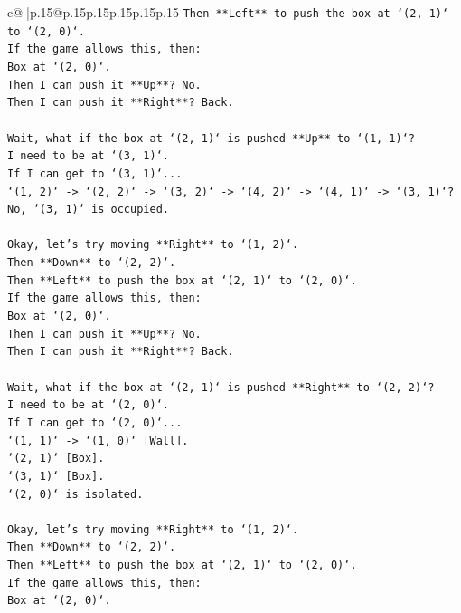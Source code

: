 \documentclass{article}
\begin{document}
{\begin{supertabular}{c@{$\;$}|p{.15\linewidth}@{}p{.15\linewidth}p{.15\linewidth}p{.15\linewidth}p{.15\linewidth}p{.15\linewidth}}
{{{\texttt{Then **Left** to push the box at `(2, 1)` to `(2, 0)`.} \\
\texttt{If the game allows this, then:} \\
\texttt{Box at `(2, 0)`.} \\
\texttt{Then I can push it **Up**? No.} \\
\texttt{Then I can push it **Right**? Back.} \\
\\ 
\texttt{Wait, what if the box at `(2, 1)` is pushed **Up** to `(1, 1)`?} \\
\texttt{I need to be at `(3, 1)`.} \\
\texttt{If I can get to `(3, 1)`...} \\
\texttt{`(1, 2)` {-}> `(2, 2)` {-}> `(3, 2)` {-}> `(4, 2)` {-}> `(4, 1)` {-}> `(3, 1)`? No, `(3, 1)` is occupied.} \\
\\ 
\texttt{Okay, let's try moving **Right** to `(1, 2)`.} \\
\texttt{Then **Down** to `(2, 2)`.} \\
\texttt{Then **Left** to push the box at `(2, 1)` to `(2, 0)`.} \\
\texttt{If the game allows this, then:} \\
\texttt{Box at `(2, 0)`.} \\
\texttt{Then I can push it **Up**? No.} \\
\texttt{Then I can push it **Right**? Back.} \\
\\ 
\texttt{Wait, what if the box at `(2, 1)` is pushed **Right** to `(2, 2)`?} \\
\texttt{I need to be at `(2, 0)`.} \\
\texttt{If I can get to `(2, 0)`...} \\
\texttt{`(1, 1)` {-}> `(1, 0)` {[}Wall{]}.} \\
\texttt{`(2, 1)` {[}Box{]}.} \\
\texttt{`(3, 1)` {[}Box{]}.} \\
\texttt{`(2, 0)` is isolated.} \\
\\ 
\texttt{Okay, let's try moving **Right** to `(1, 2)`.} \\
\texttt{Then **Down** to `(2, 2)`.} \\
\texttt{Then **Left** to push the box at `(2, 1)` to `(2, 0)`.} \\
\texttt{If the game allows this, then:} \\
\texttt{Box at `(2, 0)`.} \\
}}}
\end{supertabular}}
\end{document}
